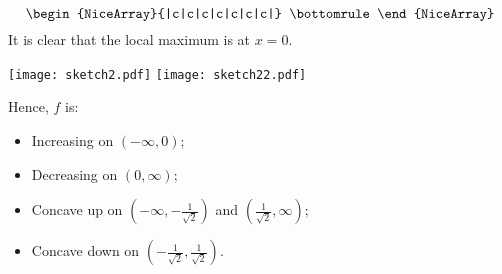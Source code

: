 \begin{Example}{}{}
\begin{enumerate}[(1)]
\[\begin{NiceArray}{|c|c|c|c|c|c|c|}
                      \bottomrule
                  \end{NiceArray} \]
              It is clear that the local maximum is at $ x=0 $.
    \end{enumerate}
    \begin{center}
        \texttt{[image: sketch2.pdf]}
        \texttt{[image: sketch22.pdf]}
    \end{center}
    Hence, $ f $ is:
    \begin{itemize}
        \item Increasing on $ (-\infty,0) $;
        \item Decreasing on $ (0,\infty) $;
        \item Concave up on $ (-\infty,-\tfrac{1}{\sqrt{2}}) $ and $ (\tfrac{1}{\sqrt{2}},\infty) $;
        \item Concave down on $ (-\tfrac{1}{\sqrt{2}},\tfrac{1}{\sqrt{2}}) $.
    \end{itemize}
\end{Example}
